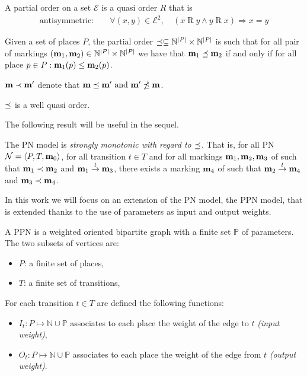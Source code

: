 \begin{defi}
  A partial order on a set $\mathcal{E}$ is a quasi order $R$ that is
  \begin{align*}
    \text{antisymmetric: } &&\forall (x, y) \in \mathcal{E}^2,\ & (x \mathrel{R} y\land y \mathrel{R} x)\Rightarrow x = y
  \end{align*}
\end{defi}

\begin{defi}
  Given a set of places $P$, the partial order \(\preceq \subseteq \mathbb{N}^{|P|} \times \mathbb{N}^{|P|}\) is such that for all pair of markings \((\mathbf{m}_1, \mathbf{m}_2) \in \mathbb{N}^{|P|} \times \mathbb{N}^{|P|}\) we have that \(\mathbf{m}_1 \preceq \mathbf{m}_2\) if and only if for all place \(p \in P : \mathbf{m}_1(p) \leq \mathbf{m}_2(p)\).
\end{defi}

\(\mathbf{m} \prec \mathbf{m'}\) denote that \(\mathbf{m} \preceq \mathbf{m'} \text{ and } \mathbf{m'} \npreceq \mathbf{m}\).

\begin{lemm}
  \label{lemm:wqo}
  $\preceq$ is a well quasi order.
\end{lemm}

The following result will be useful in the sequel.

\begin{lemm}
  The \ac{PN} model is \emph{strongly monotonic with regard to $\preceq$}. That is, for all \ac{PN} $\mathcal{N} = \langle P,T, \mathbf{m}_0\rangle$, for all transition $t \in T$ and for all markings $\mathbf{m}_1, \mathbf{m}_2, \mathbf{m}_3$ of \tupleN such that $\mathbf{m}_1 \prec \mathbf{m}_2$ and $\mathbf{m}_1 \stackrel{t}{\to} \mathbf{m}_3$, there exists a marking $\mathbf{m}_4$ of \tupleN such that $\mathbf{m}_2 \stackrel{t}{\to} \mathbf{m}_4$ and $\mathbf{m}_3 \prec \mathbf{m}_4$. 
\end{lemm}

In this work we will focus on an extension of the \ac{PN} model, the \ac{PPN} model, that is extended thanks to the use of parameters as input and output weights.

\begin{defi}
  A \acf{PPN} \SPTP is a weighted oriented bipartite graph with a finite set $\mathbb{P}$ of parameters. The two subsets of vertices are:
  \begin{itemize}
    \item $P$: a finite set of places,
    \item $T$: a finite set of transitions,
  \end{itemize}
  For each transition $t \in T$ are defined the following functions:
  \begin{itemize}
    \item $I_t : P \mapsto \mathbb{N} \cup \mathbb{P}$ associates to each place the weight of the edge to $t$ \emph{(input weight)},
    \item $O_t : P \mapsto \mathbb{N} \cup \mathbb{P}$ associates to each place the weight of the edge from $t$ \emph{(output weight)}.
  \end{itemize}
\end{defi}


